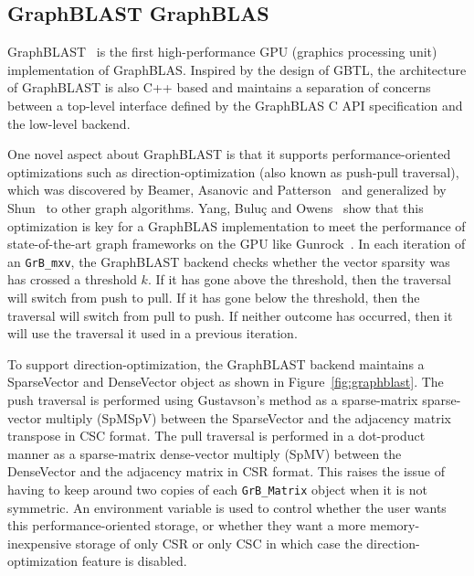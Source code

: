 \subsection{GraphBLAST GraphBLAS}


GraphBLAST~\cite{Yang:2019:GBL} is the first high-performance GPU (graphics processing unit) implementation of GraphBLAS. Inspired by the design of GBTL, the architecture of GraphBLAST is also C++ based and maintains a separation of concerns between a top-level interface defined by the GraphBLAS C API specification and the low-level backend. 

One novel aspect about GraphBLAST is that it supports performance-oriented optimizations such as direction-optimization (also known as push-pull traversal), which was discovered by Beamer, Asanovic and Patterson~\cite{Beamer:2012:DOB} and generalized by Shun~\cite{Shun:2013:Ligra} to other graph algorithms. Yang, Bulu\c{c} and Owens~\cite{Yang:2018:IPE} show that this optimization is key for a GraphBLAS implementation to meet the performance of state-of-the-art graph frameworks on the GPU like Gunrock~\cite{Wang:2017:GGG}. In each iteration of an \verb'GrB_mxv', the GraphBLAST backend checks whether the vector sparsity was has crossed a threshold $k$. If it has gone above the threshold, then the traversal will switch from push to pull. If it has gone below the threshold, then the traversal will switch from pull to push. If neither outcome has occurred, then it will use the traversal it used in a previous iteration. 

To support direction-optimization, the GraphBLAST backend maintains a SparseVector and DenseVector object as shown in Figure~\ref{fig:graphblast}. The push traversal is performed using Gustavson's method as a sparse-matrix sparse-vector multiply (SpMSpV) between the SparseVector and the adjacency matrix transpose in CSC format. The pull traversal is performed in a dot-product manner as a sparse-matrix dense-vector multiply (SpMV) between the DenseVector and the adjacency matrix in CSR format. This raises the issue of having to keep around two copies of each \verb'GrB_Matrix' object when it is not symmetric. An environment variable is used to control whether the user wants this performance-oriented storage, or whether they want a more memory-inexpensive storage of only CSR or only CSC in which case the direction-optimization feature is disabled.

